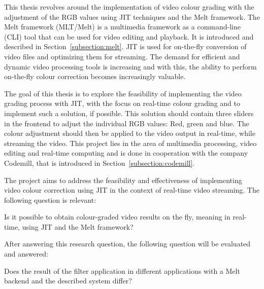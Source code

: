 \documentclass[../MasterThesis.tex]{subfiles}
\begin{document}
	
	This thesis revolves around the implementation of video colour grading with the adjustment of the RGB values using JIT techniques and the Melt framework. The Melt framework (MLT/Melt) is a multimedia framework as a command-line (CLI) tool that can be used for video editing and playback. It is introduced and described in Section~\ref{subsection:melt}.
	JIT is used for on-the-fly conversion of video files and optimizing them for streaming. 
	The demand for efficient and dynamic video processing tools is increasing and with this, the ability to perform on-the-fly colour correction becomes increasingly valuable. 
	
	
	The goal of this thesis is to explore the feasibility of implementing the video grading process with JIT, with the focus on real-time colour grading and to implement such a solution, if possible. This solution should contain three sliders in the frontend to adjust the individual RGB values: Red, green and blue. The colour adjustment should then be applied to the video output in real-time, while streaming the video.
	This project lies in the area of multimedia processing, video editing and real-time computing and is done in cooperation with the company Codemill, that is introduced in Section~\ref{subsection:codemill}.
	
	
	
	The project aims to address the feasibility and effectiveness of implementing video colour correction using JIT in the context of real-time video streaming. The following question is relevant:
	
	\begin{researchbox}
		Is it possible to obtain colour-graded video results on the fly, meaning in real-time, using JIT and the Melt framework?
	\end{researchbox}
	
	After answering this research question, the following question will be evaluated and answered:
	
	\begin{researchbox}
		Does the result of the filter application in different applications with a Melt backend and the described system differ? 
	\end{researchbox}
\end{document}
